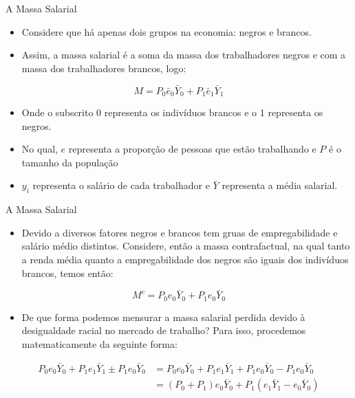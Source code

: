 \documentclass[10pt, xcolor=x11names,compress]{beamer}
\begin{document}
	\begin{frame}{A Massa Salarial}
	\begin{itemize}
		\item Considere que há apenas dois grupos na economia: negros e brancos.
		\item Assim, a massa salarial é a soma da massa dos trabalhadores negros e com a massa dos trabalhadores brancos, logo:
	\end{itemize}
	\begin{equation}
	M =  P_{0}\bar{e}_{0} \bar{Y}_{0} + P_{1}\bar{e}_{1} \bar{Y}_{1} 
	\end{equation}
	\begin{itemize}
		\item 	Onde o subscrito 0 representa os indivíduos brancos e o 1 representa os negros. 
		\item	No qual, $e$ representa a proporção de pessoas que estão trabalhando e $P$ é o tamanho da população
		\item	$y_{i}$ representa o salário de cada trabalhador e $\bar{Y}$ representa a média salarial. 
	\end{itemize}	
\end{frame}	

	\begin{frame}{A Massa Salarial}
	\begin{itemize}
		\item 	Devido a diversos fatores negros e brancos tem gruas de empregabilidade e salário médio distintos. Considere, então a massa contrafactual, na qual tanto a renda média quanto a empregabilidade dos negros são iguais dos indivíduos brancos, temos então:
	\end{itemize}
	\begin{equation}
		M^{c} = P_{0}e_{0}\bar{Y}_{0} + P_{1}e_{0}\bar{Y}_{0}
	\end{equation}	
	\begin{itemize}
		\item 	De que forma podemos mensurar a massa salarial perdida devido à desigualdade racial no mercado de trabalho? Para isso, procedemos matematicamente da seguinte forma:
		\end{itemize}
	\begin{align}
	P_{0}e_{0}\bar{Y}_{0} + P_{1}e_{1}\bar{Y}_{1} \pm P_{1}e_{0}\bar{Y}_{0} &= P_{0}e_{0}\bar{Y}_{0} + P_{1}e_{1}\bar{Y}_{1} + P_{1}e_{0}\bar{Y}_{0} - P_{1}e_{0}\bar{Y}_{0} \\
	&= (P_{0} +  P_{1})e_{0}\bar{Y}_{0} + P_{1}(e_{1}\bar{Y}_{1} - e_{0}\bar{Y}_{0})
	\end{align}
	\end{frame}	
\end{document}

